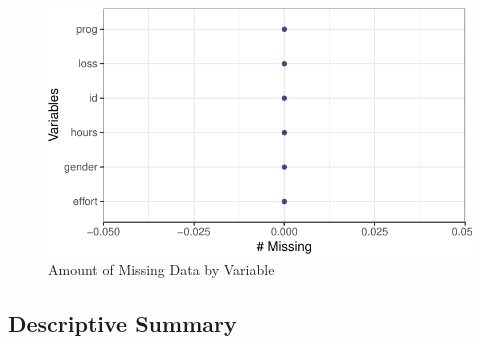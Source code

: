 \documentclass[
]{article}
\begin{document}
\begin{figure}[hb]

\includegraphics{Appendix_ex_weightloss_files/figure-latex/unnamed-chunk-12-1} \hfill{}

\caption{Amount of Missing Data by Variable}\label{fig:unnamed-chunk-12}
\end{figure}

\clearpage

\hypertarget{descriptive-summary}{%
\subsection{Descriptive Summary}\label{descriptive-summary}}
\end{document}
